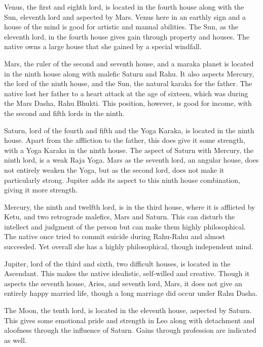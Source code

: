 

Venus, the first and eighth lord, is located in the fourth house along with the Sun, eleventh lord and aspected by Mars. Venus here in an earthly sign and a house of the mind is good for artistic and manual abilities. The Sun, as the eleventh lord, in the fourth house gives gain through property and houses. The native owns a large house that she gained by a special windfall.

 

Mars, the ruler of the second and seventh house, and a maraka planet is located in the ninth house along with malefic Saturn and Rahu. It also aspects Mercury, the lord of the ninth house, and the Sun, the natural karaka for the father. The native lost her father to a heart attack at the age of sixteen, which was during the Mars Dasha, Rahu Bhukti. This position, however, is good for income, with the second and fifth lords in the ninth.

 

Saturn, lord of the fourth and fifth and the Yoga Karaka, is located in the ninth house. Apart from the affliction to the father, this does give it some strength, with a Yoga Karaka in the ninth house. The aspect of Saturn with Mercury, the ninth lord, is a weak Raja Yoga. Mars as the seventh lord, an angular house, does not entirely weaken the Yoga, but as the second lord, does not make it particularly strong. Jupiter adds its aspect to this ninth house combination, giving it more strength.

 

Mercury, the ninth and twelfth lord, is in the third house, where it is afflicted by Ketu, and two retrograde malefics, Mars and Saturn. This can disturb the intellect and judgment of the person but can make them highly philosophical. The native once tried to commit suicide during Rahu-Rahu and almost succeeded. Yet overall she has a highly philosophical, though independent mind.

Jupiter, lord of the third and sixth, two difficult houses, is located in the Ascendant. This makes the native idealistic, self-willed and creative. Though it aspects the seventh house, Aries, and seventh lord, Mars, it does not give an entirely happy married life, though a long marriage did occur under Rahu Dasha.

 

The Moon, the tenth lord, is located in the eleventh house, aspected by Saturn. This gives some emotional pride and strength in Leo along with detachment and aloofness through the influence of Saturn. Gains through profession are indicated as well.

